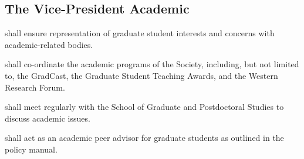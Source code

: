 \subsection {The Vice-President Academic} 
\begin{longenum}[ label*=\thesubsection.\arabic*., align=left]
	\item shall ensure representation of graduate student interests and concerns with academic-related bodies.
    \item shall co-ordinate the academic programs of the Society, including, but not limited to, the GradCast, the Graduate Student Teaching Awards, and the Western Research Forum.
    \item shall meet regularly with the School of Graduate and Postdoctoral Studies to discuss academic issues.
    \item shall act as an academic peer advisor for graduate students as outlined in the policy manual.
    
\end{longenum}

